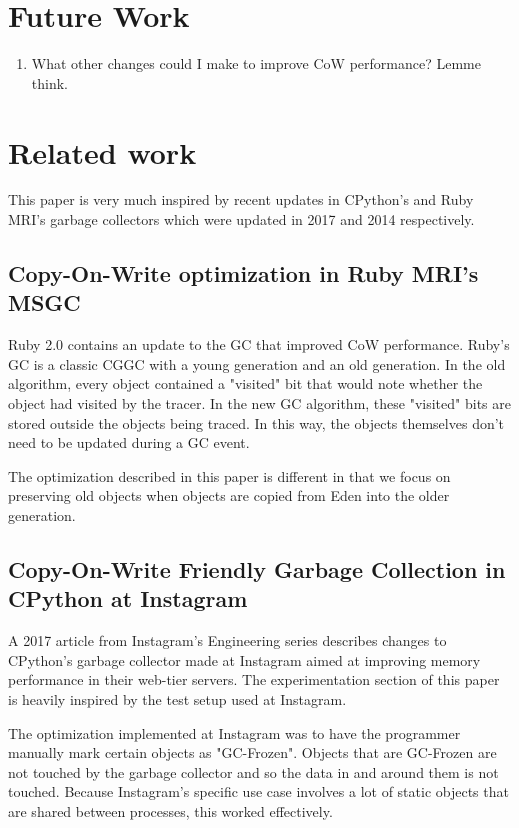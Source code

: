 \documentclass{article}
\begin{document}
\section{Future Work}\label{sec:futurework}
\begin{enumerate}
    \item What other changes could I make to improve CoW performance?  Lemme think.
\end{enumerate}

\section{Related work}\label{sec:relatedwork}

This paper is very much inspired by recent updates in CPython's and Ruby MRI's garbage collectors which were updated in 2017 and 2014 respectively.  

\subsection{Copy-On-Write optimization in Ruby MRI's MSGC}
Ruby 2.0 contains an update to the GC that improved CoW performance.  Ruby's GC is a classic CGGC with a young generation and an old generation.  In the old algorithm, every object contained a "visited" bit that would note whether the object had visited by the tracer.  In the new GC algorithm, these "visited" bits are stored outside the objects being traced.  In this way, the objects themselves don't need to be updated during a GC event.  

The optimization described in this paper is different in that we focus on preserving old objects when objects are copied from Eden into the older generation.  

\subsection{Copy-On-Write Friendly Garbage Collection in CPython at Instagram}
A 2017 article from Instagram's Engineering series describes changes to CPython's garbage collector made at Instagram aimed at improving memory performance in their web-tier servers.  The experimentation section of this paper is heavily inspired by the test setup used at Instagram.

The optimization implemented at Instagram was to have the programmer manually mark certain objects as "GC-Frozen".  Objects that are GC-Frozen are not touched by the garbage collector and so the data in and around them is not touched.  Because Instagram's specific use case involves a lot of static objects that are shared between processes, this worked effectively.  

\newpage
\onecolumn
\nocite{*}


\end{document}
